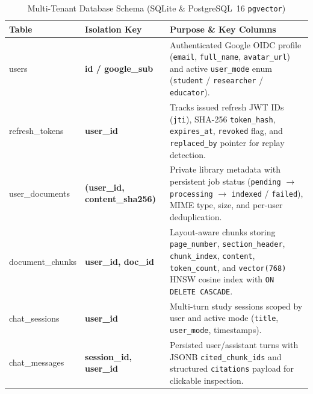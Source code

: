 \documentclass[12pt,a4paper,oneside]{report}
\begin{document}
\begin{table}[htbp]
    \centering
    \caption{Multi-Tenant Database Schema (SQLite \& PostgreSQL~16 \texttt{pgvector})}
    \label{tab:schema}
    \footnotesize
    \begin{tabularx}{\textwidth}{>{\ttfamily}l>{\bfseries}lX}
        \toprule
        \textnormal{\textbf{Table}} & Isolation Key & Purpose \& Key Columns \\
        \midrule
        users & id / google\_sub & Authenticated Google OIDC profile (\texttt{email}, \texttt{full\_name}, \texttt{avatar\_url}) and active \texttt{user\_mode} enum (\texttt{student} / \texttt{researcher} / \texttt{educator}). \\
        refresh\_tokens & user\_id & Tracks issued refresh JWT IDs (\texttt{jti}), SHA-256 \texttt{token\_hash}, \texttt{expires\_at}, \texttt{revoked} flag, and \texttt{replaced\_by} pointer for replay detection. \\
        user\_documents & (user\_id, content\_sha256) & Private library metadata with persistent job status (\texttt{pending} $\to$ \texttt{processing} $\to$ \texttt{indexed} / \texttt{failed}), MIME type, size, and per-user deduplication. \\
        document\_chunks & user\_id, doc\_id & Layout-aware chunks storing \texttt{page\_number}, \texttt{section\_header}, \texttt{chunk\_index}, \texttt{content}, \texttt{token\_count}, and \texttt{vector(768)} HNSW cosine index with \texttt{ON DELETE CASCADE}. \\
        chat\_sessions & user\_id & Multi-turn study sessions scoped by user and active mode (\texttt{title}, \texttt{user\_mode}, timestamps). \\
        chat\_messages & session\_id, user\_id & Persisted user/assistant turns with JSONB \texttt{cited\_chunk\_ids} and structured \texttt{citations} payload for clickable inspection. \\
        \bottomrule
    \end{tabularx}
\end{table}
\end{document}
